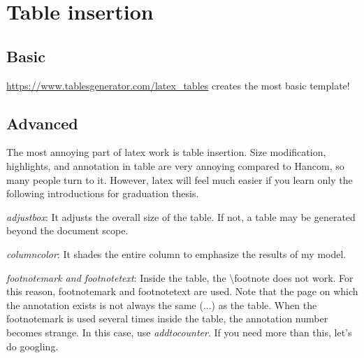 \documentclass[twoside,ms]{snuthesis_utf8}
\begin{document}
\clearpage
\section{Table insertion}
\subsection{Basic}
\url{https://www.tablesgenerator.com/latex_tables} creates the most basic template!

\clearpage
\subsection{Advanced}
The most annoying part of latex work is table insertion.
Size modification, highlights, and annotation in table are very annoying compared to Hancom, so many people turn to it.
However, latex will feel much easier if you learn only the following introductions for graduation thesis.

\textit{adjustbox}: It adjusts the overall size of the table. If not, a table may be generated  beyond the document scope.

\textit{columncolor}: It shades the entire column to emphasize the results of my model.

\textit{footnotemark and footnotetext}: Inside the table, the $\setminus$footnote does not work. 
For this reason, footnotemark and footnotetext are used.
Note that the page on which the annotation exists is not always the same (...) as the table.
When the footnotemark is used several times inside the table, the annotation number becomes strange.
In this case, use \textit{addtocounter}.
\newline
\newline
If you need more than this, let's do googling.
\end{document}
